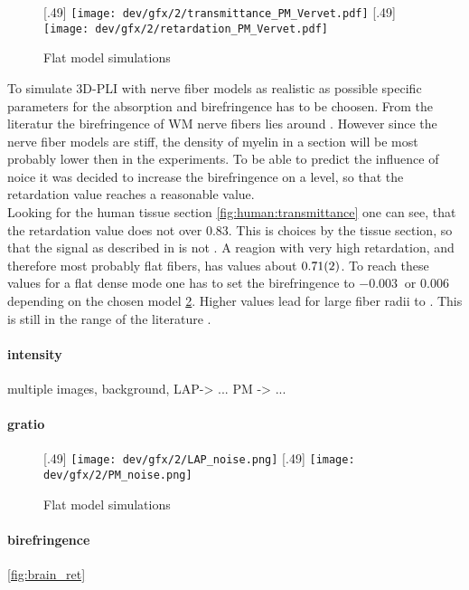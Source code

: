 % 
\begin{figure}[!t]
\centering
{}[.49\textwidth]{
\texttt{[image: dev/gfx/2/transmittance\_PM\_Vervet.pdf]}}\hfill
{}[.49\textwidth]{
\texttt{[image: dev/gfx/2/retardation\_PM\_Vervet.pdf]}}
\caption{Flat model simulations}
\label{fig:parameterModelSim}
\end{figure}
% 
To simulate \ac{3D-PLI} with nerve fiber models as realistic as possible specific parameters for the absorption and birefringence has to be choosen.
From the literatur the birefringence of \ac{WM} nerve fibers lies around \dummy{}.
However since the nerve fiber models are stiff, the density of myelin in a section will be most probably lower then in the experiments.
To be able to predict the influence of noice it was decided to increase the birefringence on a level, so that the retardation value reaches a reasonable value.
\\
Looking for the human tissue section \cref{fig:human:transmittance} one can see, that the retardation value does not over 0.83.
This is choices by the tissue section, so that the signal as described in \dummy{} is not \dummy{}.
A reagion with very high retardation, and therefore most probably flat fibers, has values about $\SI{0.71\pm0.02}{}$.
To reach these values for a flat dense mode one has to set the birefringence to $\SI{-0.003}{}$ or $\SI{0.006}{}$ depending on the chosen model \cref{fig:parameterModelSim}. Higher values lead for large fiber radii to \dummy{}. This is still in the range of the literature \dummy{} .
% 
% 
\paragraph{intensity}
% 
multiple images, background, 
LAP-> ...
PM -> ...
% 
\paragraph{gratio}
% 
\begin{figure}[!t]
\centering
{}[.49\textwidth]{
\texttt{[image: dev/gfx/2/LAP\_noise.png]}}\hfill
{}[.49\textwidth]{
\texttt{[image: dev/gfx/2/PM\_noise.png]}}
\caption{Flat model simulations}
\label{fig:parameterModelSim}
\end{figure}
% 
\paragraph{birefringence}
\cref{fig:brain_ret}
% 
